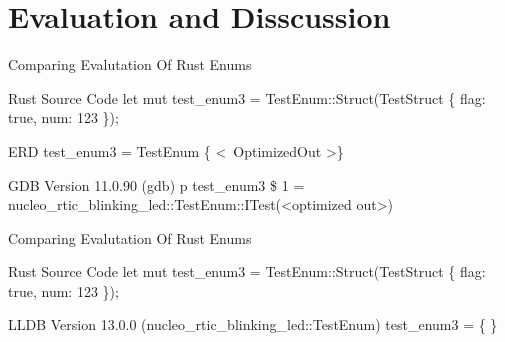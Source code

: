 \section{Evaluation and Disscussion}

\begin{frame}{Comparing Evalutation Of Rust Enums}
	\begin{alertblock}{Rust Source Code}
		let mut test\_enum3 = TestEnum::Struct(TestStruct \{ flag: true, num: 123 \});
    	\end{alertblock}

	\begin{block}{ERD}
		test\_enum3 = TestEnum \{ \textless \ OptimizedOut \textgreater \}
    	\end{block}

    	\begin{block}{GDB Version 11.0.90}
		(gdb) p test\_enum3\newline
		\$ 1 = nucleo\_rtic\_blinking\_led::TestEnum::ITest(\textless optimized out\textgreater)
    	\end{block}
\end{frame}


\begin{frame}{Comparing Evalutation Of Rust Enums}
	
	\begin{alertblock}{Rust Source Code}
		let mut test\_enum3 = TestEnum::Struct(TestStruct \{ flag: true, num: 123 \});
    	\end{alertblock}

    	\begin{block}{LLDB Version 13.0.0}
		(nucleo\_rtic\_blinking\_led::TestEnum) test\_enum3 = \{\newline
		\newline
		\newline
		\newline
		\newline
		\text{\ \ \}}\newline
		\newline
		\newline
		\}
    	\end{block}

\end{frame}

